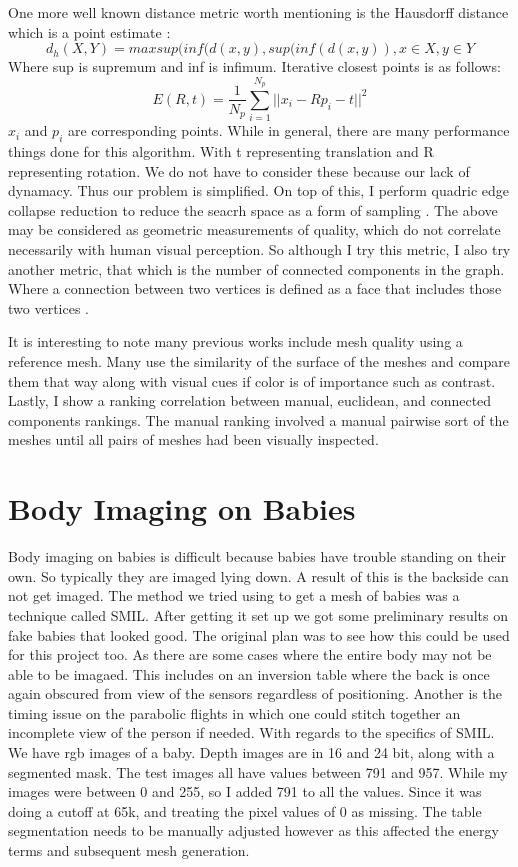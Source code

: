 One more well known distance metric worth mentioning is the Hausdorff distance which is a point estimate \cite{huttenlocher1993comparing}:
\begin{equation}
	d_h(X, Y) = max{sup(inf(d(x, y),sup(inf(d(x,y))}, x\in X, y\in Y
\end{equation}
Where sup is supremum and inf is infimum.
Iterative closest points is as follows:
\begin{equation}
	E(R, t) = \frac{1}{N_p}\sum_{i=1}^{N_p}||x_i - Rp_i - t||^2
\end{equation}
$x_i$ and $p_i$ are corresponding points.
While in general, there are many performance things done for this algorithm. With t representing translation and R representing rotation. We do not have to consider these because our lack of dynamacy. Thus our problem is simplified. On top of this, I perform quadric edge collapse reduction to reduce the seacrh space as a form of sampling \cite{hussain2004efficient}.
The above may be considered as geometric measurements of quality, which do not correlate necessarily with human visual perception. So although I try this metric, I also try another metric, that which is the number of connected components in the graph. Where a connection between two vertices is defined as a face that includes those two vertices \cite{chung2002connected}.

It is interesting to note many previous works include mesh quality using a reference mesh. Many use the similarity of the surface of the meshes and compare them that way along with visual cues if color is of importance such as contrast. Lastly, I show a ranking correlation between manual, euclidean, and connected components rankings. The manual ranking involved a manual pairwise sort of the meshes until all pairs of meshes had been visually inspected.
\section{Body Imaging on Babies}
Body imaging on babies is difficult because babies have trouble standing on their own. So typically they are imaged lying down. A result of this is the backside can not get imaged. The method we tried using to get a mesh of babies was a technique called SMIL\cite{hesse2018learning}. After getting it set up we got some preliminary results on fake babies that looked good. The original plan was to see how this could be used for this project too. As there are some cases where the entire body may not be able to be imagaed. This includes on an inversion table where the back is once again obscured from view of the sensors regardless of positioning. Another is the timing issue on the parabolic flights in which one could stitch together an incomplete view of the person if needed. With regards to the specifics of SMIL. We have rgb images of a baby. Depth images are in 16 and 24 bit, along with a segmented mask. The test images all have values between 791 and 957. While my images were between 0 and 255, so I added 791 to all the values. Since it was doing a cutoff at 65k, and treating the pixel values of 0 as missing. The table segmentation needs to be manually adjusted however as this affected the energy terms and subsequent mesh generation.

